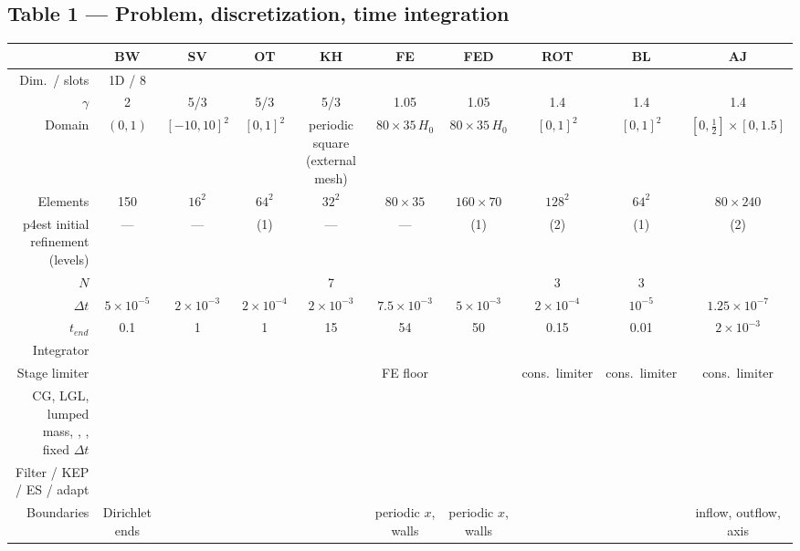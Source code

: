 \documentclass[10pt]{article}
\newcommand{\no}{\textcolor{black!45}{---}}
\begin{document}
\begin{landscape}
\section*{Table 1 --- Problem, discretization, time integration}
{\footnotesize
\begin{tabular}{@{}R*{9}{C}@{}}
\toprule
& BW & SV & OT & KH & FE & FED & ROT & BL & AJ\\
\midrule
Dim.\ / slots & 1D / 8 &  &  &  &  &  &  &  & \\
$\gamma$ & 2 & 5/3 & 5/3 & 5/3 & 1.05 & 1.05 & 1.4 & 1.4 & 1.4\\
Domain & $(0,1)$ & $[-10,10]^2$ & $[0,1]^2$ & periodic square (external mesh) & $80\times35\,H_0$ & $80\times35\,H_0$ & $[0,1]^2$ & $[0,1]^2$ & $[0,\tfrac12]\times[0,1.5]$\\
Elements & 150 & $16^2$ & $64^2$ & $32^2$ & $80\times35$ & $160\times70$ & $128^2$ & $64^2$ & $80\times240$\\
p4est initial refinement (levels) & \no & \no &  (1) & \no & \no &  (1) &  (2) &  (1) &  (2)\\
$N$ &  &  &  & 7 &  &  & 3 & 3 & \\
$\Delta t$ & $5\times10^{-5}$ & $2\times10^{-3}$ & $2\times10^{-4}$ & $2\times10^{-3}$ & $7.5\times10^{-3}$ & $5\times10^{-3}$ & $2\times10^{-4}$ & $10^{-5}$ & $1.25\times10^{-7}$\\
$t_{end}$ & 0.1 & 1 & 1 & 15 & 54 & 50 & 0.15 & 0.01 & $2\times10^{-3}$\\
Integrator &  &  &  &  &  &  &  &  & \\
Stage limiter &  &  &  &  & FE floor &  & cons.\ limiter & cons.\ limiter & cons.\ limiter\\
CG, LGL, lumped mass, , , fixed $\Delta t$ &  &  &  &  &  &  &  &  & \\
Filter / KEP / ES / adapt &  &  &  &  &  &  &  &  & \\
Boundaries & Dirichlet ends &  &  &  & periodic $x$, walls & periodic $x$, walls &  &  & inflow, outflow, axis\\

\end{tabular}}
\end{landscape}
\end{document}
